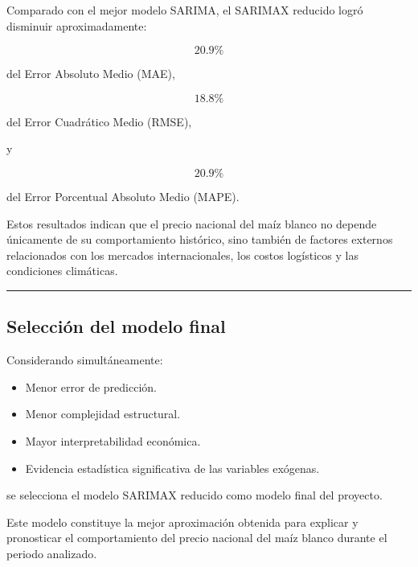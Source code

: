 \documentclass[11pt]{article}
\providecommand{\tightlist}{%
      \setlength{\itemsep}{0pt}\setlength{\parskip}{0pt}}
\begin{document}
Comparado con el mejor modelo SARIMA, el SARIMAX reducido logró
disminuir aproximadamente:

\[
20.9\%
\]

del Error Absoluto Medio (MAE),

\[
18.8\%
\]

del Error Cuadrático Medio (RMSE),

y

\[
20.9\%
\]

del Error Porcentual Absoluto Medio (MAPE).

Estos resultados indican que el precio nacional del maíz blanco no
depende únicamente de su comportamiento histórico, sino también de
factores externos relacionados con los mercados internacionales, los
costos logísticos y las condiciones climáticas.

\begin{center}\rule{0.5\linewidth}{0.5pt}\end{center}

\hypertarget{selecciuxf3n-del-modelo-final}{%
\subsection{Selección del modelo
final}\label{selecciuxf3n-del-modelo-final}}

Considerando simultáneamente:

\begin{itemize}
\tightlist
\item
  Menor error de predicción.
\item
  Menor complejidad estructural.
\item
  Mayor interpretabilidad económica.
\item
  Evidencia estadística significativa de las variables exógenas.
\end{itemize}

se selecciona el modelo SARIMAX reducido como modelo final del proyecto.

Este modelo constituye la mejor aproximación obtenida para explicar y
pronosticar el comportamiento del precio nacional del maíz blanco
durante el periodo analizado.
\end{document}

